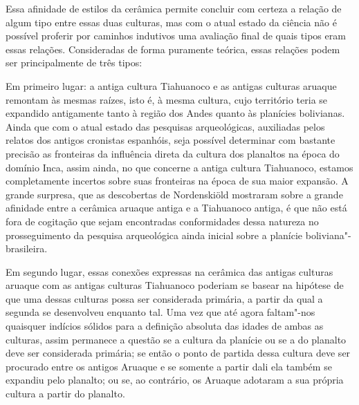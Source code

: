 Essa afinidade de estilos da cerâmica permite concluir com certeza a
relação de algum tipo entre essas duas culturas, mas com o atual estado
da ciência não é possível proferir por caminhos indutivos uma avaliação
final de quais tipos eram essas relações. Consideradas de forma
puramente teórica, essas relações podem ser principalmente de três
tipos:

Em primeiro lugar: a antiga cultura Tiahuanoco e as antigas culturas
aruaque remontam às mesmas raízes, isto é, à mesma cultura, cujo
território teria se expandido antigamente tanto à região dos Andes
quanto às planícies bolivianas. Ainda que com o atual estado das
pesquisas arqueológicas, auxiliadas pelos relatos dos antigos cronistas
espanhóis, seja possível determinar com bastante precisão as fronteiras
da influência direta da cultura dos planaltos na época do domínio Inca,
assim ainda, no que concerne a antiga cultura Tiahuanoco, estamos
completamente incertos sobre suas fronteiras na época de sua maior
expansão. A grande surpresa, que as descobertas de Nordenskiöld
mostraram sobre a grande afinidade entre a cerâmica aruaque antiga e a
Tiahuanoco antiga, é que não está fora de cogitação que sejam
encontradas conformidades dessa natureza no prosseguimento da pesquisa
arqueológica ainda inicial sobre a planície boliviana"-brasileira.

Em segundo lugar, essas conexões expressas na cerâmica das antigas
culturas aruaque com as antigas culturas Tiahuanoco poderiam se basear
na hipótese de que uma dessas culturas possa ser considerada primária,
a partir da qual a segunda se desenvolveu enquanto tal. Uma vez que até
agora faltam"-nos quaisquer indícios sólidos para a definição absoluta
das idades de ambas as culturas, assim permanece a questão se a cultura
da planície ou se a do planalto deve ser considerada primária; se então
o ponto de partida dessa cultura deve ser procurado entre os antigos
Aruaque e se somente a partir dali ela também se expandiu pelo planalto;
ou se, ao contrário, os Aruaque adotaram a sua própria cultura a partir
do planalto.

